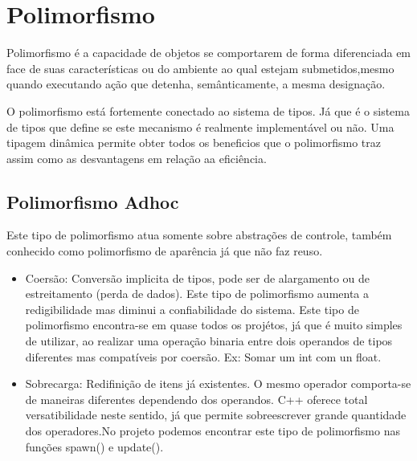 \documentclass[rel_mlp]{iiufrgs}
\begin{document}
\section{Polimorfismo}
Polimorfismo é a capacidade de objetos se comportarem de forma diferenciada em face de suas características ou do ambiente ao qual estejam submetidos,mesmo quando executando ação que detenha, semânticamente, a mesma designação.

O polimorfismo está fortemente conectado ao sistema de tipos. Já que é o sistema de tipos que define se este mecanismo é realmente implementável ou não.  Uma tipagem dinâmica permite obter todos os beneficios que o polimorfismo traz assim como as desvantagens em relação aa eficiência.

\subsection{Polimorfismo Adhoc}
Este tipo de polimorfismo atua somente sobre abstrações de controle, também conhecido como polimorfismo de aparência já que não faz reuso.
\bigbreak
{}
 \begin{itemize}
	\item{ Coersão:  Conversão implicita de tipos, pode ser de alargamento ou de estreitamento (perda de dados). Este tipo de polimorfismo aumenta a redigibilidade mas diminui a confiabilidade do sistema.
Este tipo de polimorfismo encontra-se em quase todos os projétos, já que é muito simples de utilizar, ao realizar uma operação binaria entre dois operandos de tipos diferentes mas compatíveis por coersão. Ex: Somar um int com un float.
}
\item Sobrecarga: Redifinição de itens já existentes. O mesmo operador comporta-se de maneiras diferentes dependendo dos operandos. C++ oferece total versatibilidade neste sentido, já que permite sobreescrever grande quantidade dos operadores.No projeto podemos encontrar este tipo de polimorfismo nas funções spawn() e update().
 \end{itemize}
\end{document}
